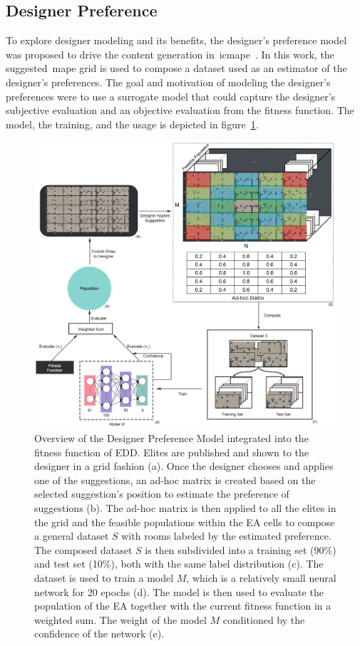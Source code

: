 \subsection{Designer Preference}

To explore designer modeling and its benefits, the designer's preference model was proposed to drive the content generation in~\acrshort{icmape}~\cite{Alvarez2020-DesignerPreference}. In this work, the suggested~\acrshort{mape} grid is used to compose a dataset used as an estimator of the designer's preferences. The goal and motivation of modeling the designer's preferences were to use a surrogate model that could capture the designer's subjective evaluation and an objective evaluation from the fitness function. The model, the training, and the usage is depicted in figure~\ref{fig:desPrefModel}. 

\begin{figure}
\includegraphics[width=\textwidth]{figures/DesPref-figs/desPrefModel.png}
\caption{Overview of the Designer Preference Model integrated into the fitness function of EDD. Elites are published and shown to the designer in a grid fashion (a). Once the designer chooses and applies one of the suggestions, an ad-hoc matrix is created based on the selected suggestion's position to estimate the preference of suggestions (b). The ad-hoc matrix is then applied to all the elites in the grid and the feasible populations within the EA cells to compose a general dataset $S$ with rooms labeled by the estimated preference. The composed dataset $S$ is then subdivided into a training set (90\%) and test set (10\%), both with the same label distribution (c). The dataset is used to train a model $M$, which is a relatively small neural network for 20 epochs (d). The model is then used to evaluate the population of the EA together with the current fitness function in a weighted sum. The weight of the model $M$ conditioned by the confidence of the network (e).} \label{fig:desPrefModel}
\end{figure}

